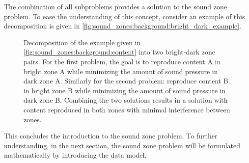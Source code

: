 The combination of all subproblems provides a solution to the sound zone problem. 
To ease the understanding of this concept, consider an example of this decomposition is given in 
\autoref{fig:sound_zones:background:bright_dark_example}.

\begin{figure}[]
    \centering
    \begin{subfigure}{0.49\linewidth}
        \centering
        \scalebox{0.9}{}
    \end{subfigure}
    \begin{subfigure}{0.49\linewidth}
        \centering
        \scalebox{0.9}{}
    \end{subfigure}
    \caption{Decomposition of the example given in \autoref{fig:sound_zones:background:content} into 
        two bright-dark zone pairs.
        For the first problem, the goal is to reproduce content A in bright zone A while minimizing 
        the amount of sound pressure in dark zone A.
        Similarly for the second problem: reproduce content B in bright zone B while minimizing the 
        amount of sound pressure in dark zone B.
        Combining the two solutions results in a solution with content reproduced in both zones with 
        minimal interference between zones.}
    \label{fig:sound_zones:background:bright_dark_example}
\end{figure}

This concludes the introduction to the sound zone problem.
To further understanding, in the next section, the sound zone problem will be formulated mathematically by introducing the data model.



